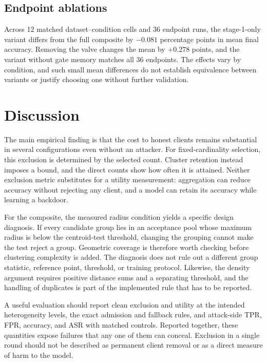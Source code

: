 \documentclass[journal]{IEEEtran}
\begin{document}
\subsection{Endpoint ablations}

Across 12 matched dataset--condition cells and 36 endpoint runs, the stage-1-only variant differs from the full composite by $-0.081$ percentage points in mean final accuracy. Removing the valve changes the mean by $+0.278$ points, and the variant without gate memory matches all 36 endpoints. The effects vary by condition, and such small mean differences do not establish equivalence between variants or justify choosing one without further validation.

\section{Discussion}\label{sec:discussion}
The main empirical finding is that the cost to honest clients remains substantial in several configurations even without an attacker. For fixed-cardinality selection, this exclusion is determined by the selected count. Cluster retention instead imposes a bound, and the direct counts show how often it is attained. Neither exclusion metric substitutes for a utility measurement: aggregation can reduce accuracy without rejecting any client, and a model can retain its accuracy while learning a backdoor.

For the composite, the measured radius condition yields a specific design diagnosis. If every candidate group lies in an acceptance pool whose maximum radius is below the centroid-test threshold, changing the grouping cannot make the test reject a group. Geometric coverage is therefore worth checking before clustering complexity is added. The diagnosis does not rule out a different group statistic, reference point, threshold, or training protocol. Likewise, the density argument requires positive distance sums and a separating threshold, and the handling of duplicates is part of the implemented rule that has to be reported.

A useful evaluation should report clean exclusion and utility at the intended heterogeneity levels, the exact admission and fallback rules, and attack-side TPR, FPR, accuracy, and ASR with matched controls. Reported together, these quantities expose failures that any one of them can conceal. Exclusion in a single round should not be described as permanent client removal or as a direct measure of harm to the model.
\end{document}

